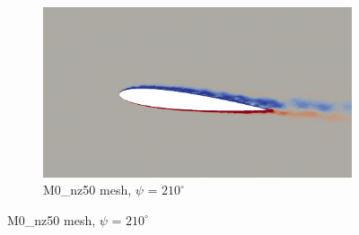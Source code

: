 
\begin{figure}[H]
	\centering
	\begin{center}
		\begin{subfigure}[b]{0.6\textwidth}
			\centering
			\includegraphics[width=1\textwidth]{figures/zonal_adapt_results/vorticity_plots_Re200k/M0/phase_210.png}
			\caption{M0\_nz50 mesh, $\psi$ = $210^\circ$}
			\label{fig:M0_Re200k_sp_psi210}
		\end{subfigure}
	\end{center}


\end{figure}
